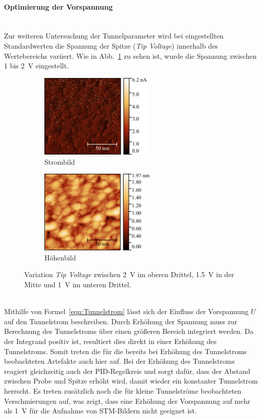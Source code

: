 \documentclass[a4paper,twoside,final]{article}
\begin{document}
\paragraph{Optimierung der Vorspannung}\label{par:OptimierungSpannung}$~$\\
Zur weiteren Untersuchung der Tunnelparameter wird bei eingestellten Standardwerten die Spannung der Spitze (\textit{Tip Voltage}) innerhalb des Wertebereichs variiert. Wie in Abb.~\ref{fig:Spannungsvariation} zu sehen ist, wurde die Spannung zwischen 1 bis \SI{2}{\volt} eingestellt.
\begin{figure}[htp]
    \centering
    \begin{subfigure}{0.45\textwidth}
        \includegraphics[height=4cm]{Bilder/Image01960_Spannungsvariation_Strom.pdf}
        \caption{Strombild}
    \end{subfigure}
    \hspace{0.5cm}
    \begin{subfigure}{0.45\textwidth}
        \includegraphics[height=4cm]{Bilder/Image01960_Spannungsvariation.pdf}
        \caption{Höhenbild}
    \end{subfigure}
    \caption{Variation \textit{Tip Voltage} zwischen \SI{2}{\volt} im oberen Drittel, \SI{1.5}{\volt} in der Mitte und \SI{1}{\volt} im unteren Drittel.}
    \label{fig:Spannungsvariation}
\end{figure}\\
Mithilfe von Formel~\eqref{eqn:Tunnelstrom} lässt sich der Einfluss der Vorspannung $U$ auf den Tunnelstrom beschreiben. Durch Erhöhung der Spannung muss zur Berechnung des Tunnelstroms über einen größeren Bereich integriert werden. Da der Integrand positiv ist, resultiert dies direkt in einer Erhöhung des Tunnelstroms. Somit treten die für die bereits bei Erhöhung des Tunnelstroms beobachteten Artefakte auch hier auf. Bei der Erhöhung des Tunnelstroms reagiert gleichzeitig auch der PID-Regelkreis und sorgt dafür, dass der Abstand zwischen Probe und Spitze erhöht wird, damit wieder ein konstanter Tunnelstrom herrscht. Es treten zusätzlich noch die für kleine Tunnelströme beobachteten Verschmierungen auf, was zeigt, dass eine Erhöhung der Vorspannung auf mehr als \SI{1}{\volt} für die Aufnahme von STM-Bildern nicht geeignet ist.\\
\end{document}
